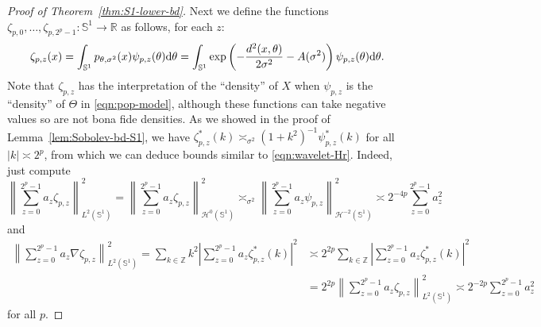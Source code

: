 \documentclass[preprint]{imsart}
\theoremstyle{plain}
\theoremstyle{definition}
\newcommand{\Rbb}{\mathbb{R}}
\newcommand{\Zbb}{\mathbb{Z}}
\newcommand{\Hcal}{\mathcal{H}}
\newcommand{\diff}{\textnormal{d}}
\begin{document}
\begin{appendix}
\begin{proof}[Proof of Theorem~\ref{thm:S1-lower-bd}]
    Next we define the functions $\zeta_{p,0},\ldots, \zeta_{p,2^p-1}:\mathbb{S}^1\to\Rbb$ as follows, for each $z$:
    \begin{equation*}
        \zeta_{p,z}(x)= \int_{\mathbb{S}^1}p_{\theta,\sigma^2}(x)\psi_{p,z}(\theta)\diff \theta = \int_{\mathbb{S}^1}\exp\left(-\frac{d^2(x,\theta)}{2\sigma^2}-A(\sigma^2)\right)\psi_{p,z}(\theta)\diff \theta.
    \end{equation*}
    Note that $\zeta_{p,z}$ has the interpretation of the ``density'' of $X$ when $\psi_{p,z}$ is the ``density'' of $\Theta$ in \eqref{eqn:pop-model}, although these functions can take negative values so are not bona fide densities.
    As we showed in the proof of Lemma~\ref{lem:Sobolev-bd-S1}, we have $\zeta_{p,z}^{\ast}(k) \asymp_{\sigma^2} (1+k^2)^{-1}\psi_{p,z}^{\ast}(k)$ for all $|k|\asymp 2^p$, from which we can deduce bounds similar to \eqref{eqn:wavelet-Hr}.
    Indeed, just compute
    \begin{equation}\label{eqn:zeta-Hr}
        \left\|\sum_{z=0}^{2^p-1}a_z\zeta_{p,z}\right\|_{L^2(\mathbb{S}^1)}^2 =\left\|\sum_{z=0}^{2^p-1}a_z\zeta_{p,z}\right\|_{\Hcal^{0}(\mathbb{S}^1)}^2 \asymp_{\sigma^2} \left\|\sum_{z=0}^{2^p-1}a_z\psi_{p,z}\right\|_{\Hcal^{-2}(\mathbb{S}^1)}^2 \asymp 2^{-4p}\sum_{z=0}^{2^p-1}a_z^2
    \end{equation}
    and
    \begin{equation}\label{eqn:grad-zeta-Hr}
        \begin{split}
        \left\|\sum_{z=0}^{2^p-1}a_z\nabla\zeta_{p,z}\right\|_{L^2(\mathbb{S}^1)}^2 = \sum_{k\in\Zbb}
        k^2\left|\sum_{z=0}^{2^p-1}a_z\zeta_{p,z}^{\ast}(k)\right|^2 &\asymp 2^{2p}\sum_{k\in\Zbb}\left|\sum_{z=0}^{2^p-1}a_z\zeta_{p,z}^{\ast}(k)\right|^2 \\
        &= 2^{2p}\left\|\sum_{z=0}^{2^p-1}a_z\zeta_{p,z}\right\|^2_{L^2(\mathbb{S}^1)} \asymp 2^{-2p}\sum_{z=0}^{2^p-1}a_z^2
        \end{split}
    \end{equation}
    for all $p$.


\end{proof}
\end{appendix}
\end{document}
